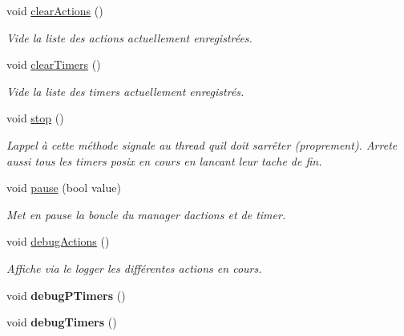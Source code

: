 \begin{DoxyCompactItemize}
\mbox{\label{classActionManagerTimer_a20bd3b06bc5f9b9fb747bb27d154d88d}} 
void \hyperlink{classActionManagerTimer_a20bd3b06bc5f9b9fb747bb27d154d88d}{clear\+Actions} ()
\begin{DoxyCompactList}\small\item\em Vide la liste des actions actuellement enregistrées. \end{DoxyCompactList}\item 
\mbox{\label{classActionManagerTimer_af2afa74f3445e32823371b926aa3f55c}} 
void \hyperlink{classActionManagerTimer_af2afa74f3445e32823371b926aa3f55c}{clear\+Timers} ()
\begin{DoxyCompactList}\small\item\em Vide la liste des timers actuellement enregistrés. \end{DoxyCompactList}\item 
void \hyperlink{classActionManagerTimer_a072223491745aebbaa0344124635b7f8}{stop} ()
\begin{DoxyCompactList}\small\item\em L\textquotesingle{}appel à cette méthode signale au thread qu\textquotesingle{}il doit s\textquotesingle{}arrêter (proprement). Arrete aussi tous les timers posix en cours en lancant leur tache de fin. \end{DoxyCompactList}\item 
\mbox{\label{classActionManagerTimer_ad14a24ea8609f916a5fb3e43c7f0e856}} 
void \hyperlink{classActionManagerTimer_ad14a24ea8609f916a5fb3e43c7f0e856}{pause} (bool value)
\begin{DoxyCompactList}\small\item\em Met en pause la boucle du manager d\textquotesingle{}actions et de timer. \end{DoxyCompactList}\item 
\mbox{\label{classActionManagerTimer_a40e5f9d8c2706434376d416d3e43fd3b}} 
void \hyperlink{classActionManagerTimer_a40e5f9d8c2706434376d416d3e43fd3b}{debug\+Actions} ()
\begin{DoxyCompactList}\small\item\em Affiche via le logger les différentes actions en cours. \end{DoxyCompactList}\item 
\mbox{\label{classActionManagerTimer_a17c6563c7a6c0955c7ca2230b038d832}} 
void {\bfseries debug\+P\+Timers} ()
\item 
\mbox{\label{classActionManagerTimer_aef6be0b68f6595c8ac5ce89c66b9333a}} 
void {\bfseries debug\+Timers} ()
\end{DoxyCompactItemize}
